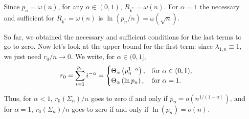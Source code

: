 \documentclass[11pt,notitlepage]{article}
\begin{document}
Since $p_n = \omega(n)$, for any $\alpha \in (0,1)$, $R_{k^\ast} = \omega(n)$. For $\alpha = 1$ the necessary and sufficient for $R_{k^\ast} = \omega(n)$ is $\ln(p_n/n) = \omega(\sqrt{n})$. 

So far, we obtained the necessary and sufficient conditions for the
last terms to go to zero.
Now let's look at the upper bound for the
first term: since $\lambda_{1,n} \equiv 1$, we just need $r_0/n \to 0$. We
write, for $\alpha \in (0,1]$,
\begin{equation*}
r_0 = \sum_{i = 1}^{p_n} i^{-\alpha}
=\begin{cases}
\Theta_\alpha\left(p_n^{1-\alpha}\right),& \text{for }\alpha \in (0,1),\\
\Theta_\alpha\left(\ln p_n\right),& \text{for }\alpha =1.
\end{cases}\\
\end{equation*}

Thus, for $\alpha < 1$, $r_0(\Sigma_n)/n$ goes to zero if and only if
$p_n = o\left(n^{1/(1-\alpha)}\right)$, and for $\alpha = 1$, $r_0(\Sigma_n)/n$ goes to zero if and only if $\ln(p_n) = o(n)$.
\end{document}
